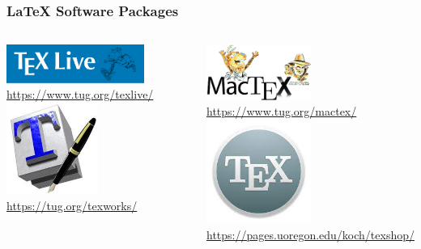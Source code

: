 
\begin{frame}
\frametitle{\LaTeX{} Software Packages}
\begin{columns}
\begin{center}
\includegraphics[width=0.75\textwidth]{img/texlive_logo.png}
{\small \url{https://www.tug.org/texlive/}}
\includegraphics[width=0.5\textwidth]{img/texworks_logo.jpg}
{\small \url{https://tug.org/texworks/}}
\end{center}

\begin{center}
\includegraphics[width=0.5\textwidth]{img/mactex_logo.png} \\
{\small \url{https://www.tug.org/mactex/}}
\includegraphics[width=0.5\textwidth]{img/texshop_logo.jpg} \\
{\small \url{https://pages.uoregon.edu/koch/texshop/}}
\end{center}
\end{columns}
\end{frame}


